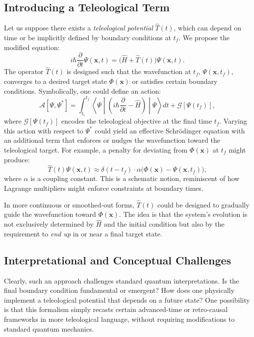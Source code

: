 \documentclass[11pt]{article}
\begin{document}
\subsection{Introducing a Teleological Term}
Let us suppose there exists a \emph{teleological potential} $\hat{T}(t)$, which can depend on time or be implicitly defined by boundary conditions at $t_f$. We propose the modified equation:
\begin{equation}
    i \hbar \frac{\partial}{\partial t} \Psi(\mathbf{x}, t)
    = \Big( \hat{H} + \hat{T}(t) \Big) \Psi(\mathbf{x}, t).
    \label{eq:teleological-schrodinger}
\end{equation}
The operator $\hat{T}(t)$ is designed such that the wavefunction at $t_f$, $\Psi(\mathbf{x}, t_f)$, converges to a desired target state $\Phi(\mathbf{x})$ or satisfies certain boundary conditions. Symbolically, one could define an action:
\begin{equation}
    \mathcal{A}[\Psi, \Psi^*] = \int_{t_i}^{t_f} \left\langle \Psi \middle\vert
    \left( i\hbar \frac{\partial}{\partial t} - \hat{H} \right) \middle\vert \Psi \right\rangle dt
    + \mathcal{G}[\Psi(t_f)],
\end{equation}
where $\mathcal{G}[\Psi(t_f)]$ encodes the teleological objective at the final time $t_f$. Varying this action with respect to $\Psi^*$ could yield an effective Schr\"odinger equation with an additional term that enforces or nudges the wavefunction toward the teleological target. For example, a penalty for deviating from $\Phi(\mathbf{x})$ at $t_f$ might produce:
\begin{equation}
    \hat{T}(t) \Psi(\mathbf{x}, t) \approx \delta(t - t_f) \cdot \alpha \big( \Phi(\mathbf{x}) - \Psi(\mathbf{x}, t_f) \big),
\end{equation}
where $\alpha$ is a coupling constant. This is a schematic notion, reminiscent of how Lagrange multipliers might enforce constraints at boundary times.

In more continuous or smoothed-out forms, $\hat{T}(t)$ could be designed to gradually guide the wavefunction toward $\Phi(\mathbf{x})$. The idea is that the system’s evolution is not exclusively determined by $\hat{H}$ and the initial condition but also by the requirement to \emph{end up} in or near a final target state.

\subsection{Interpretational and Conceptual Challenges}
Clearly, such an approach challenges standard quantum interpretations. Is the final boundary condition fundamental or emergent? How does one physically implement a teleological potential that depends on a future state? One possibility is that this formalism simply recasts certain advanced-time or retro-causal frameworks in more teleological language, without requiring modifications to standard quantum mechanics.
\end{document}
